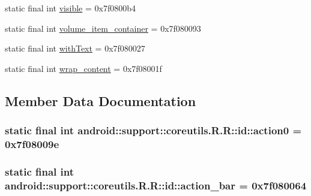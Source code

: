 \begin{CompactItemize}
\item 
static final int \hyperlink{classandroid_1_1support_1_1coreutils_1_1_r_1_1id_36261c63b2d1decfe7c4c1a420f7d25e}{visible} = 0x7f0800b4
\item 
static final int \hyperlink{classandroid_1_1support_1_1coreutils_1_1_r_1_1id_d675cb9b7a4ff85579a11a8cffd2ab9c}{volume\_\-item\_\-container} = 0x7f080093
\item 
static final int \hyperlink{classandroid_1_1support_1_1coreutils_1_1_r_1_1id_3fa4dfa7f25aedfc02c12590f3647ba8}{withText} = 0x7f080027
\item 
static final int \hyperlink{classandroid_1_1support_1_1coreutils_1_1_r_1_1id_47d786d0ec1b4164582b9ff136377972}{wrap\_\-content} = 0x7f08001f
\end{CompactItemize}


\subsection{Member Data Documentation}
\hypertarget{classandroid_1_1support_1_1coreutils_1_1_r_1_1id_80e58cffb00744c5f2fdcbf9d0ae4b46}{
\subsubsection[{action0}]{\setlength{\rightskip}{0pt plus 5cm}static final int android::support::coreutils.R.R::id::action0 = 0x7f08009e}}
\label{classandroid_1_1support_1_1coreutils_1_1_r_1_1id_80e58cffb00744c5f2fdcbf9d0ae4b46}


\hypertarget{classandroid_1_1support_1_1coreutils_1_1_r_1_1id_2380f81edba4a28a034b7d2cee17829b}{
\subsubsection[{action\_\-bar}]{\setlength{\rightskip}{0pt plus 5cm}static final int android::support::coreutils.R.R::id::action\_\-bar = 0x7f080064}}
\label{classandroid_1_1support_1_1coreutils_1_1_r_1_1id_2380f81edba4a28a034b7d2cee17829b}


